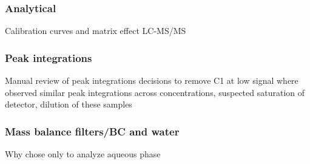 \subsubsection{Analytical}
Calibration curves and matrix effect
LC-MS/MS

\subsubsection{Peak integrations}
Manual review of peak integrations
decisions to remove C1 at low signal
where observed similar peak integrations across concentrations, suspected saturation of detector, dilution of these samples

\subsubsection{Mass balance filters/BC and water}
Why chose only to analyze aqueous phase



